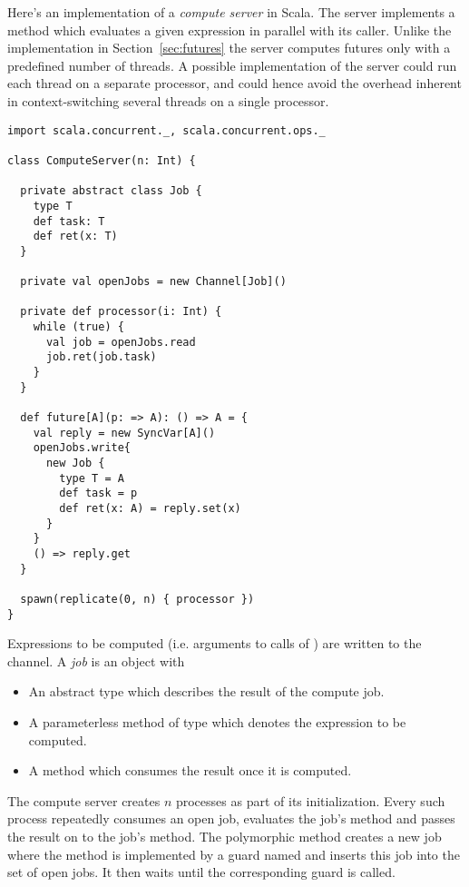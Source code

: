 {Here's an implementation of a {\em compute server} in Scala. The
server implements a  method which evaluates a given
expression in parallel with its caller. Unlike the implementation in
Section~\ref{sec:futures} the server computes futures only with a
predefined number of threads. A possible implementation of the server
could run each thread on a separate processor, and could hence avoid
the overhead inherent in context-switching several threads on a single
processor.

\begin{lstlisting}
import scala.concurrent._, scala.concurrent.ops._

class ComputeServer(n: Int) {

  private abstract class Job {
    type T
    def task: T
    def ret(x: T)
  }

  private val openJobs = new Channel[Job]()

  private def processor(i: Int) {
    while (true) {
      val job = openJobs.read
      job.ret(job.task)
    }
  }

  def future[A](p: => A): () => A = {
    val reply = new SyncVar[A]()
    openJobs.write{
      new Job {
        type T = A
        def task = p
        def ret(x: A) = reply.set(x)
      }
    }
    () => reply.get
  }

  spawn(replicate(0, n) { processor })
}
\end{lstlisting}
Expressions to be computed (i.e. arguments
to calls of ) are written to the 
channel. A {\em job} is an object with
\begin{itemize}
\item
An abstract type  which describes the result of the compute
job.
\item
A parameterless  method of type  which denotes
the expression to be computed.
\item
A  method which consumes the result once it is
computed.
\end{itemize}
The compute server creates $n$  processes as part of
its initialization.  Every such process repeatedly consumes an open
job, evaluates the job's  method and passes the result on
to the job's
 method. The polymorphic  method creates
a new job where the  method is implemented by a guard
named  and inserts this job into the set of open jobs. 
It then waits until the corresponding
 guard is called.

}
